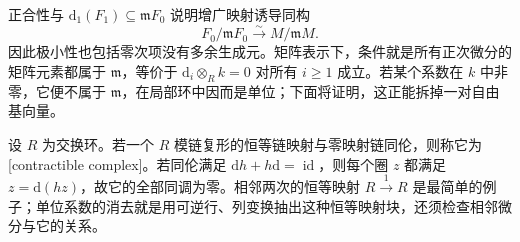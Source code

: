 正合性与 \(\mathrm{d}_1(F_1)\subseteq\mathfrak mF_0\) 说明增广映射诱导同构
\[
	F_0/\mathfrak mF_0\xrightarrow{\sim}M/\mathfrak mM.
\]
因此极小性也包括零次项没有多余生成元。矩阵表示下，条件就是所有正次微分的矩阵元素都属于 \(\mathfrak m\)，等价于 \(\mathrm{d}_i\otimes_Rk=0\) 对所有 \(i\ge1\) 成立。若某个系数在 \(k\) 中非零，它便不属于 \(\mathfrak m\)，在局部环中因而是单位；下面将证明，这正能拆掉一对自由基向量。

\ProseParagraphBreak
设 \(R\) 为交换环。若一个 \(R\) 模链复形的恒等链映射与零映射链同伦，则称它为[contractible complex]。若同伦满足 \(\mathrm{d}h+h\mathrm{d}=\operatorname{id}\)，则每个圈 \(z\) 都满足 \(z=\mathrm{d}(hz)\)，故它的全部同调为零。相邻两次的恒等映射 \(R\xrightarrow{1}R\) 是最简单的例子；单位系数的消去就是用可逆行、列变换抽出这种恒等映射块，还须检查相邻微分与它的关系。

